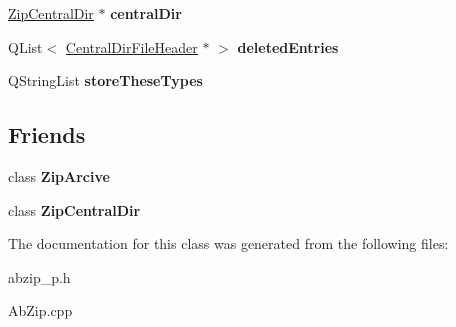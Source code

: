 \begin{DoxyCompactItemize}
\item 
\hyperlink{class_zip_central_dir}{Zip\+Central\+Dir} $\ast$ {\bfseries central\+Dir}\hypertarget{class_ab_zip_private_ab5cadf9117b7ab6cc7711e93127af0fa}{}\label{class_ab_zip_private_ab5cadf9117b7ab6cc7711e93127af0fa}

\item 
Q\+List$<$ \hyperlink{class_central_dir_file_header}{Central\+Dir\+File\+Header} $\ast$ $>$ {\bfseries deleted\+Entries}\hypertarget{class_ab_zip_private_a32d7aa5413e5c9466b7acf2f7c48ef66}{}\label{class_ab_zip_private_a32d7aa5413e5c9466b7acf2f7c48ef66}

\item 
Q\+String\+List {\bfseries store\+These\+Types}\hypertarget{class_ab_zip_private_a512306be0adb15021037896ef86984b0}{}\label{class_ab_zip_private_a512306be0adb15021037896ef86984b0}

\end{DoxyCompactItemize}
\subsection*{Friends}
\begin{DoxyCompactItemize}
\item 
class {\bfseries Zip\+Arcive}\hypertarget{class_ab_zip_private_aa1813ea3c4dcbbf3675ff0d4b4fb8f75}{}\label{class_ab_zip_private_aa1813ea3c4dcbbf3675ff0d4b4fb8f75}

\item 
class {\bfseries Zip\+Central\+Dir}\hypertarget{class_ab_zip_private_a291f425329925d1e089ba36a615980d1}{}\label{class_ab_zip_private_a291f425329925d1e089ba36a615980d1}

\end{DoxyCompactItemize}


The documentation for this class was generated from the following files\+:\begin{DoxyCompactItemize}
\item 
abzip\+\_\+p.\+h\item 
Ab\+Zip.\+cpp\end{DoxyCompactItemize}
